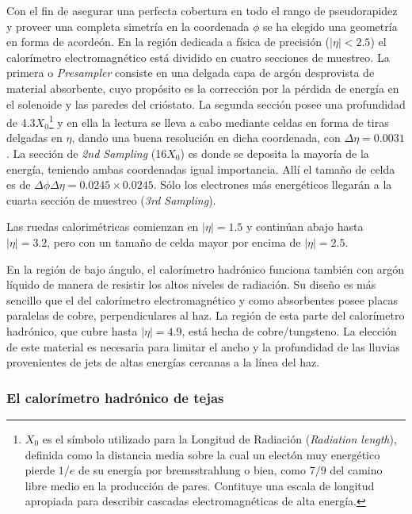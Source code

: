   Con el fin de asegurar una perfecta cobertura en todo el rango de pseudorapidez  y proveer una completa simetr\'ia en la coordenada $\phi$ se ha elegido una geometr\'ia en forma de acorde\'on. En la regi\'on dedicada a f\'isica de precisi\'on ($|\eta|<2.5$) el calor\'imetro electromagn\'etico est\'a dividido en cuatro secciones de muestreo. La primera o \emph{Presampler} consiste en una delgada capa de arg\'on desprovista de material absorbente, cuyo prop\'osito es la correcci\'on por la p\'erdida de energ\'ia  en el solenoide y las paredes del cri\'ostato. La segunda secci\'on posee una profundidad de 4.3$X_{0}$\footnote{$X_{0}$ es el s\'imbolo utilizado para la Longitud de Radiaci\'on (\emph{Radiation length}), definida como la distancia media sobre la cual un elect\'on muy energ\'etico pierde $1/e$ de su energ\'ia por bremsstrahlung o bien, como $7/9$ del camino libre medio en la producci\'on de pares. Contituye una escala de longitud apropiada para describir cascadas electromagn\'eticas de alta energ\'ia.} y en ella la lectura se lleva a cabo mediante celdas en forma de tiras delgadas en $\eta$, dando una buena resoluci\'on en dicha coordenada, con $\Delta\eta=0.0031$. La secci\'on de \emph{2nd Sampling} (16$X_{0}$) es donde se deposita la mayor\'ia de la energ\'ia, teniendo ambas coordenadas igual importancia. All\'i el tama\~no de celda es de $\Delta\phi\Delta\eta=0.0245\times 0.0245$. S\'olo los electrones m\'as energ\'eticos llegar\'an a la cuarta secci\'on de muestreo (\emph{3rd Sampling}).

   Las ruedas calorim\'etricas comienzan en $|\eta|=1.5$ y contin\'uan abajo hasta $|\eta|=3.2$, pero con un tama\~no de celda mayor por encima de $|\eta|=2.5$.

   En la regi\'on de bajo \'angulo, el calor\'imetro hadr\'onico funciona tambi\'en con arg\'on l\'iquido de manera de resistir los altos niveles de radiaci\'on. Su dise\~no es m\'as sencillo que el del calor\'imetro electromagn\'etico y como absorbentes posee placas paralelas de cobre, perpendiculares al haz. La regi\'on de esta parte del calor\'imetro hadr\'onico, que cubre hasta $|\eta|=4.9$, est\'a hecha de cobre/tungsteno. La elecci\'on de este material es necesaria para limitar el ancho y la profundidad de las lluvias provenientes de jets de altas energ\'ias cercanas a la l\'inea del haz. %

\subsubsection{El calor\'imetro hadr\'onico de tejas}

